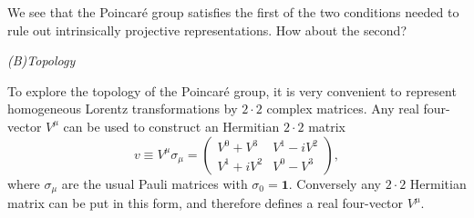 We see that the Poincar\'e group satisfies the first of the two
conditions needed to rule out intrinsically projective representations. How
about the second?

\begin{center}
\emph{(B)\quad Topology}
\end{center}

To explore the topology of the Poincar\'e group, it is very
convenient to represent homogeneous Lorentz transformations by $2\cdot2$
complex matrices. Any real four-vector $V^\mu$ can be used to construct an
Hermitian $2\cdot2$ matrix
\begin{equation}
  v\equiv V^\mu\sigma_\mu
    =\begin{pmatrix}
      V^0+V^3 & V^1-iV^2\\
      V^1+iV^2 & V^0-V^3
    \end{pmatrix},
  \tag{2.7.36}\label{eq:2.7.36}
\end{equation}
where $\sigma_\mu$ are the usual Pauli matrices with
$\sigma_0=\mathbf{1}$. Conversely any $2\cdot2$ Hermitian matrix can be put in
this form, and therefore defines a real four-vector $V^\mu$.

